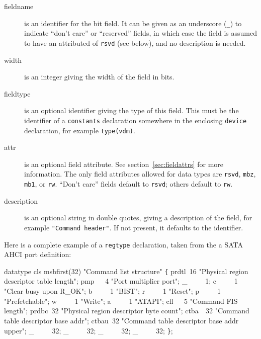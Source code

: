 \documentclass[a4paper,11pt,twoside]{report}
\begin{document}
\begin{description}

\item[fieldname] is an identifier for the bit field.  It can be
  given as an underscore (\texttt{\_}) to indicate ``don't care'' or
  ``reserved'' fields, in which case the field is
  assumed to have an attributed of \texttt{rsvd} (see below), and no
  description is needed. 

\item[width] is an integer giving the width of the field in bits. 

\item[fieldtype] is an optional identifier giving the type of this field.
  This must be the identifier of a \texttt{constants} declaration
  somewhere in the enclosing \texttt{device} declaration, for example
  \texttt{type(vdm)}. 

\item[attr] is an optional field
  attribute.  See section~\ref{sec:fieldattrs} for more information.
  The only field attributes allowed for data types are \texttt{rsvd},
  \texttt{mbz}, \texttt{mb1}, or \texttt{rw}.  ``Don't care'' fields
  default to \texttt{rsvd}; others default to \texttt{rw}. 

\item[description] is an optional string in double quotes, giving a
  description of the field, for example \texttt{"Command header"}. 
  If not present, it defaults to the identifier.  

\end{description}

Here is a complete example of a \texttt{regtype} declaration, taken from the
a SATA AHCI port definition: 
\begin{example}
  datatype cls msbfirst(32) "Command list structure" \verb+{+
      prdtl\verb+ +16 "Physical region descriptor table length";
      pmp\verb+   +4  "Port multiplier port";
      \_\verb+     +1;
      c\verb+     +1 "Clear busy upon R\_OK";
      b\verb+     +1 "BIST";
      r\verb+     +1 "Reset";
      p\verb+     +1 "Prefetchable";
      w\verb+     +1 "Write";
      a\verb+     +1 "ATAPI";
      cfl\verb+   +5 "Command FIS length";
      prdbc\verb+ +32 "Physical region descriptor byte count";
      ctba\verb+  +32 "Command table descriptor base addr";
      ctbau\verb+ +32 "Command table descriptor base addr upper";
      \_\verb+     +32;
      \_\verb+     +32;
      \_\verb+     +32;
      \_\verb+     +32;
  \verb+}+;
\end{example}
\end{document}
